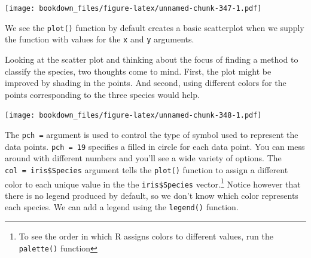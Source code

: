 \documentclass[]{krantz}
\makeatletter
\newenvironment{Shaded}{\begin{snugshade}}{\end{snugshade}}
\newcommand{\KeywordTok}[1]{\textcolor[rgb]{0.27,0.27,0.27}{\textbf{#1}}}
\newcommand{\DataTypeTok}[1]{\textcolor[rgb]{0.27,0.27,0.27}{#1}}
\newcommand{\DecValTok}[1]{\textcolor[rgb]{0.06,0.06,0.06}{#1}}
\newcommand{\FloatTok}[1]{\textcolor[rgb]{0.06,0.06,0.06}{#1}}
\newcommand{\StringTok}[1]{\textcolor[rgb]{0.5,0.5,0.5}{#1}}
\newcommand{\OperatorTok}[1]{\textcolor[rgb]{0.43,0.43,0.43}{\textbf{#1}}}
\newcommand{\NormalTok}[1]{#1}
\newenvironment{kframe}{%
\medskip{}
\setlength{\fboxsep}{.8em}
 \def\at@end@of@kframe{}%
 \ifinner\ifhmode%
  \def\at@end@of@kframe{\end{minipage}}%
  \begin{minipage}{\columnwidth}%
 \fi\fi%
 \def\FrameCommand##1{\hskip\@totalleftmargin \hskip-\fboxsep
 \colorbox{shadecolor}{##1}\hskip-\fboxsep
     \hskip-\linewidth \hskip-\@totalleftmargin \hskip\columnwidth}%
 \MakeFramed {\advance\hsize-\width
   \@totalleftmargin\z@ \linewidth\hsize
   \@setminipage}}%
 {\par\unskip\endMakeFramed%
 \at@end@of@kframe}
\renewenvironment{Shaded}{\begin{kframe}}{\end{kframe}}
\makeatother
\begin{document}
\texttt{[image: bookdown\_files/figure-latex/unnamed-chunk-347-1.pdf]}

We see the \texttt{plot()} function by default creates a basic
scatterplot when we supply the function with values for the \texttt{x}
and \texttt{y} arguments.

Looking at the scatter plot and thinking about the focus of finding a
method to classify the species, two thoughts come to mind. First, the
plot might be improved by shading in the points. And second, using
different colors for the points corresponding to the three species would
help.

\begin{Shaded}
\end{Shaded}

\texttt{[image: bookdown\_files/figure-latex/unnamed-chunk-348-1.pdf]}

The \texttt{pch\ =} argument is used to control the type of symbol used
to represent the data points. \texttt{pch\ =\ 19} specifies a filled in
circle for each data point. You can mess around with different numbers
and you'll see a wide variety of options. The
\texttt{col\ =\ iris\$Species} argument tells the \texttt{plot()}
function to assign a different color to each unique value in the the
\texttt{iris\$Species} vector.\footnote{To see the order in which R
  assigns colors to different values, run the \texttt{palette()}
  function} Notice however that there is no legend produced by default,
so we don't know which color represents each species. We can add a
legend using the \texttt{legend()} function.

\begin{Shaded}
\end{Shaded}
\end{document}
